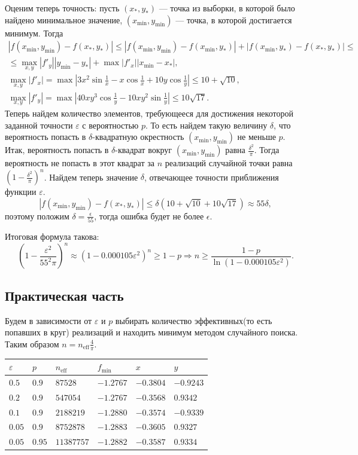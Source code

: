 \documentclass[12pt, a4paper]{article}
\begin{document}
Оценим теперь точность: пусть $\left(x_*,y_*\right)$ --- точка из выборки, в которой было найдено минимальное значение, $(x_{\min},y_{\min})$ --- точка, в которой достигается минимум. Тогда
\begin{gather*} \left| f(x_{\min} , y_{\min}) - f(x_*,y_*) \right| 
	\leqslant \left| 
	f\left(x_{\min},y_{\min}\right) - f\left(x_{\min},y_*\right)\right| + \left| f\left(x_{\min},y_*\right) - f\left(x_*,y_*\right)  \right| 
	\leqslant \\ \leqslant
	\max\limits_{x,y} \left|f'_{y}\right|\left| y_{\min}-y_*\right| + \max \left|f'_x\right|\left| x_{\min}-x_* \right|, \\
	\max\limits_{x,y} \left|f'_x\right| = \max \left| 3x^2\sin\frac1{x} - x\cos\frac1{x}+10y\cos\frac1y \right|  \leqslant 10 + \sqrt{10}, \\
	\max\limits_{x,y}\left|f'_y\right| = \max \left| 40xy^3\cos\frac1y -10xy^2\sin\frac1y \right| \leqslant 10\sqrt{17}. 
\end{gather*}
Теперь найдем количество элементов, требующееся для достижения некоторой заданной точности $\varepsilon$ с вероятностью $p$. То есть найдем такую величину $\delta$, что вероятность попасть в $\delta$-квадратную окрестность $(x_{\min},y_{\min})$ не меньше $p$.
Итак, вероятность попасть в $\delta$-квадрат вокруг $(x_{\min},y_{\min})$ равна $\frac{\delta^2}{\pi}$. Тогда вероятность не попасть в этот квадрат за $n$ реализаций случайной точки равна $\left(1-\frac{\delta^2}{\pi}\right)^n$. Найдем теперь значение $\delta$, отвечающее точности приближения функции $\varepsilon$.
\[\left| f(x_{\min} , y_{\min}) - f(x_*,y_*) \right| \leqslant \delta\left( 10 + \sqrt{10} + 10\sqrt{17}\right) \approx 55\delta,  \]
поэтому положим $\delta = \frac \epsilon{55}$, тогда ошибка будет не более $\epsilon$.

Итоговая формула такова: \[ \left(1-\frac{\varepsilon^2}{55^2\pi}\right)^n \approx \left( 1-0.000105\varepsilon^2 \right) ^n \geqslant 1-p \Rightarrow  n \geqslant \frac{1-p}{\ln\left( 1-0.000105\varepsilon^2 \right) }.\] 

\subsection{Практическая часть}
Будем в зависимости от $\varepsilon$ и $p$ выбирать количество эффективных(то есть попавших в круг) реализаций и находить минимум методом случайного поиска. Таким образом $n=n_{\text{eff} }\frac{4}{\pi}$.

\begin{tabular}{|l|l|l|l|l|l|}
\hline
$\varepsilon$ & $p$ & $n_{\text{eff} }$ & $f_{\min}$ &$x$& $y$ \\
\hline
$0.5$ & $0.9$ & $87528$ & $-1.2767$ & $-0.3804$ & $-0.9243$ \\
$0.2$ & $0.9$ & $547054$ & $-1.2767$ & $-0.3568$ & $0.9342$ \\
$0.1$ & $0.9$ & $2188219$ & $-1.2880$ & $-0.3574$ & $-0.9339$ \\
$0.05$ & $0.9$ & $8752878$ & $-1.2883$ & $-0.3605$ & $0.9327$ \\
$0.05$ & $0.95$ & $11387757$ & $-1.2882$ & $-0.3587$ & $0.9334$ \\
\hline
\end{tabular}
\end{document}
